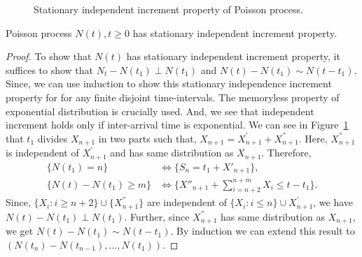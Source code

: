 \documentclass[a4paper,10pt]{article}
\begin{document}
\begin{figure}[hhhh]
\center
	
  \caption{Stationary independent increment property of Poisson process.}
	\label{Fig:IndependentIncrements}
\end{figure}
\begin{prop} Poisson process ${N(t), t\geqslant 0}$ has stationary independent increment property.
\end{prop}
\begin{proof}
To show that $N(t)$ has stationary independent increment property, it suffices to show that $N_t-N(t_{1}) \perp N(t_1)$ and $N(t) - N(t_1) \sim N(t-t_1)$. Since, we can use induction to show this stationary independence increment property for for any finite disjoint time-intervals. The memoryless property of exponential distribution is crucially used. And, we see that independent increment holds only if inter-arrival time is exponential. We can see in Figure~\ref{Fig:IndependentIncrements} that $t_1$ divides $X_{n+1}$ in two parts such that, $X_{n+1} = X_{n+1}^{'} + X_{n+1}^{''}$. Here,  $X_{n+1}^{''}$ is independent of $X_{n+1}^{'}$ and has same distribution as $X_{n+1}$. Therefore, 
\begin{align*}
\{ N(t_1) = n \} &\iff  \{ S_n = t_1 + X'_{n+1} \}, \\
\{ N(t) - N(t_1) \geqslant m \} &\iff \{ X''_{n+1} + \sum_{i=n+2}^{n+m} X_i \leqslant t - t_1 \}.
\end{align*}
Since, $\{X_i: i \geqslant n+2\}\cup\{X_{n+1}^{''}\}$ are independent of $\{X_i: i \leqslant n\}\cup{X_{n+1}^{'}}$, we have $N(t)-N(t_{1}) \perp N(t_1)$. Further, since $X_{n+1}^{''}$ has same distribution as $X_{n+1}$, we get $N(t) - N(t_1) \sim N(t-t_1)$. By induction we can extend this result to $(N(t_{n})-N(t_{n-1}),...,N(t_{1}))$. 
\end{proof}
\end{document}
